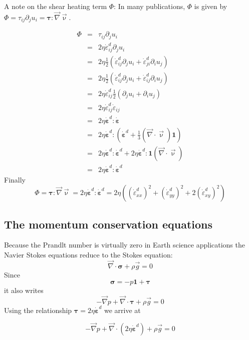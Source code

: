 A note on the shear heating term $\Phi$: In many publications, $\Phi$ 
is given by $\Phi=\tau_{ij}\partial_j u_i={\bm \tau}:{\vec \nabla}{\vec \upnu}$.

\begin{eqnarray}
\Phi 
&=& \tau_{ij}\partial_j u_i \nonumber\\
&=& 2 \eta \dot{\varepsilon}_{ij}^d\partial_j u_i \nonumber\\
&=& 2 \eta \frac{1}{2}\left( \dot{\varepsilon}_{ij}^d\partial_j u_i + \dot{\varepsilon}_{ji}^d\partial_i u_j \right) \nonumber\\
&=& 2 \eta \frac{1}{2}\left( \dot{\varepsilon}_{ij}^d\partial_j u_i + \dot{\varepsilon}_{ij}^d\partial_i u_j \right) \nonumber\\
&=& 2 \eta  \dot{\varepsilon}_{ij}^d  \frac{1}{2}\left(\partial_j u_i + \partial_i u_j \right) \nonumber\\
&=& 2 \eta  \dot{\varepsilon}_{ij}^d   \dot{\varepsilon}_{ij} \nonumber\\
&=& 2 \eta  \dot{\bm \varepsilon}^d :  \dot{\bm \varepsilon} \nonumber\\
&=& 2 \eta  \dot{\bm \varepsilon}^d : \left( \dot{\bm \varepsilon}^d +\frac{1}{3} ({\vec \nabla}\cdot{\vec \upnu}) {\bm 1} \right)\nonumber\\
&=& 2 \eta  \dot{\bm \varepsilon}^d : \dot{\bm \varepsilon}^d 
+ 2 \eta  \dot{\bm \varepsilon}^d : {\bm 1} ({\vec \nabla}\cdot{\vec \upnu}) \nonumber\\ 
&=& 2 \eta  \dot{\bm \varepsilon}^d : \dot{\bm \varepsilon}^d 
\end{eqnarray}
Finally
\[
\Phi = {\bm \tau}:{\vec \nabla}{\vec \upnu} = 2 \eta  \dot{\bm \varepsilon}^d : \dot{\bm \varepsilon}^d
= 2 \eta \left( (\dot{\varepsilon}_{xx}^d)^2 + (\dot{\varepsilon}_{yy}^d)^2 + 2(\dot{\varepsilon}_{xy}^d)^2 \right)
\]

\subsection{The momentum conservation equations} 

Because the Prandlt number is virtually zero in Earth science applications the Navier Stokes 
equations reduce to the Stokes equation:
\[
{\vec \nabla}\cdot {\bm \sigma} + \rho {\vec g} = 0
\]
Since 
\[
{\bm \sigma} = -p {\bm 1} + {\bm \tau}
\]
it also writes
\[
-{\vec \nabla}p + {\vec \nabla}\cdot {\bm \tau} + \rho {\vec g} = 0
\]
Using the relationship ${\bm \tau} = 2 \eta \dot{\bm \varepsilon}^d$ we arrive at 
\begin{mdframed}[backgroundcolor=blue!5]
\[
-{\vec \nabla}p + {\vec \nabla}\cdot (2 \eta \dot{\bm \varepsilon}^d ) + \rho {\vec g} = 0
\]
\end{mdframed}


